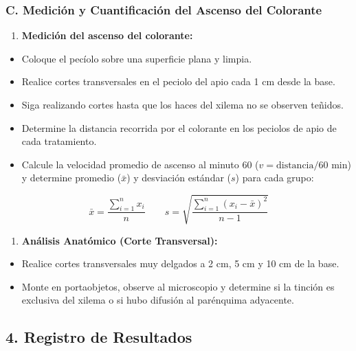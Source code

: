 \documentclass[
  spanish,
  10pt,
  letterpaper,
  twocolumn]{article}
\providecommand{\tightlist}{%
  \setlength{\itemsep}{0pt}\setlength{\parskip}{0pt}}
\begin{document}
\subsubsection{C. Medición y Cuantificación del Ascenso del
Colorante}\label{c.-mediciuxf3n-y-cuantificaciuxf3n-del-ascenso-del-colorante}

\begin{enumerate}
\def\labelenumi{\arabic{enumi}.}
\tightlist
\item
  \textbf{Medición del ascenso del colorante:}
\end{enumerate}

\begin{itemize}
\tightlist
\item
  Coloque el pecíolo sobre una superficie plana y limpia.
\item
  Realice cortes transversales en el peciolo del apio cada 1 cm desde la
  base.
\item
  Siga realizando cortes hasta que los haces del xilema no se observen
  teñidos.
\item
  Determine la distancia recorrida por el colorante en los peciolos de
  apio de cada tratamiento.
\item
  Calcule la velocidad promedio de ascenso al minuto 60
  (\(v = \text{distancia}/60\text{ min}\)) y determine promedio
  (\(\bar{x}\)) y desviación estándar (\(s\)) para cada grupo:
\end{itemize}

\[\bar{x} = \frac{\sum_{i=1}^{n} x_i}{n} \qquad s = \sqrt{\frac{\sum_{i=1}^{n} (x_i - \bar{x})^2}{n - 1}}\]

\begin{enumerate}
\def\labelenumi{\arabic{enumi}.}
\setcounter{enumi}{1}
\tightlist
\item
  \textbf{Análisis Anatómico (Corte Transversal):}
\end{enumerate}

\begin{itemize}
\tightlist
\item
  Realice cortes transversales muy delgados a 2 cm, 5 cm y 10 cm de la
  base.
\item
  Monte en portaobjetos, observe al microscopio y determine si la
  tinción es exclusiva del xilema o si hubo difusión al parénquima
  adyacente.
\end{itemize}

\subsection{4. Registro de Resultados}\label{registro-de-resultados}
\end{document}
